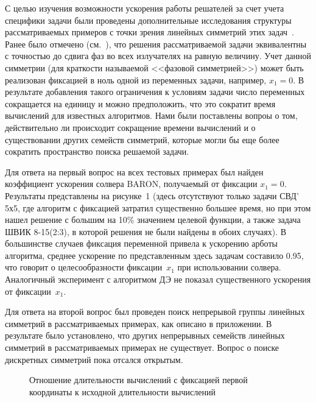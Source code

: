 \documentclass{llncs}
\begin{document}
С целью изучения возможности ускорения работы решателей за счет учета специфики задачи были проведены дополнительные исследования
структуры рассматриваемых примеров с точки зрения линейных симметрий этих задач~\cite{yurkov:symmetry}. Ранее было отмечено (см.~\cite{tyunin:daor}), что решения рассматриваемой задачи эквивалентны с точностью до сдвига фаз во всех излучателях на равную величину.
Учет данной симметрии (для краткости называемой <<фазовой симметрией>>) может быть реализован фиксацией в ноль одной из переменных задачи, например, $x_1=0$. В результате добавления такого ограничения к условиям задачи число переменных сокращается на единицу и можно предположить, что это сократит время вычислений для известных алгоритмов. Нами были поставлены вопроы о том, действительно ли происходит сокращение времени вычислений и о существовании других семейств симметрий, которые могли бы еще более сократить пространство поиска решаемой задачи. 

Для ответа на первый вопрос на всех тестовых примерах был найден коэффициент ускорения солвера BARON, получаемый от фиксации $x_1=0$. Результаты представлены на рисунке~1 (здесь отсутствуют только задачи СВД' 5х5, где алгоритм с фиксацией затратил существенно большее время, но при этом нашел решение с большим на 10\% значением целевой функции, а также задача ШВИК 8-15(2:3), в которой решения не были найдены в обоих случаях).     В большинстве случаев фиксация переменной привела к ускорению арботы алгоритма, среднее ускорение по представленным здесь задачам составило 0.95, что говорит о целесообразности фиксации~$x_1$ при использовании солвера. Аналогичный эксперимент с алгоритмом ДЭ не показал существенного ускорения от фиксации~$x_1$. 

Для ответа на второй вопрос был проведен поиск непрерывой группы линейных симметрий в рассматриваемых примерах, как описано в приложении. В результате было установлено, что других непрерывных семейств линейных симметрий в рассматриваемых примерах не существует. Вопрос о поиске дискретных симметрий пока отсался открытым.   

\begin{figure}
\caption{Отношение длительности вычислений с фиксацией первой координаты к исходной длительности вычислений}
\label{ris:ring}
\end{figure}
\end{document}
